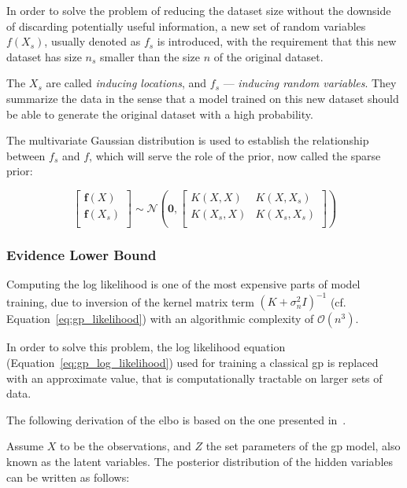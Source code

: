 In order to solve the problem of reducing the dataset size without the downside
of discarding potentially useful information, a new set of random variables
$f(X_s)$, usually denoted as $f_s$ is introduced, with the requirement that this
new dataset has size $n_s$  smaller than the size $n$ of the original dataset. 

The $X_s$ are called \textit{inducing locations}, and $f_s$ --- \textit{inducing
random variables}. They summarize the data in the sense that a model trained on
this new dataset should be able to generate the original dataset with a high
probability.

The multivariate Gaussian distribution is used to establish the relationship
between $f_s$ and $f$, which will serve the role of the prior, now called the
sparse prior:

\begin{equation}
    \begin{bmatrix}
        \mathbf{f}(X) \\
        \mathbf{f}(X_s) \\
    \end{bmatrix} \sim
    \mathcal{N}\left(
        \mathbf{0}, 
        \begin{bmatrix}
            K(X, X) & K(X, X_s) \\
            K(X_s, X) & K(X_s, X_s) \\
        \end{bmatrix}
    \right)
\end{equation}

\subsubsection{Evidence Lower Bound}\label{sec:elbo}

Computing the log likelihood is one of the most expensive parts of model
training, due to inversion of the kernel matrix term ${\left(K +
\sigma_n^2I\right)}^{-1}$ (cf. Equation~\ref{eq:gp_likelihood}) with an
algorithmic complexity of $\mathcal{O}(n^3)$.

In order to solve this problem, the log likelihood equation
(Equation~\ref{eq:gp_log_likelihood}) used for training a
classical \acrshort{gp} is replaced with an approximate value, that is
computationally tractable on larger sets of data.

The following derivation of the \acrshort{elbo} is based on the one presented
in~\cite{yangUnderstandingVariationalLower}.

Assume $X$ to be the observations, and $Z$ the set parameters of the
\acrshort{gp} model, also known as the latent variables. The posterior
distribution of the hidden variables can be written as follows:

